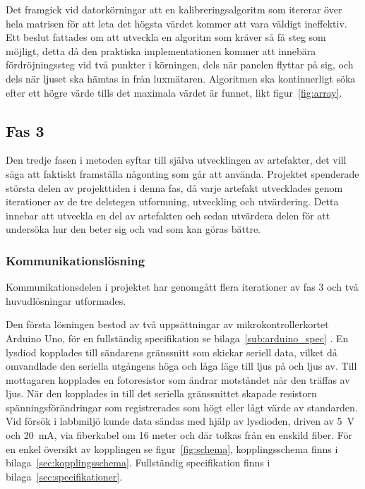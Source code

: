         Det framgick vid datorkörningar att en kalibreringsalgoritm som itererar över hela matrisen för att leta det högsta värdet kommer att vara väldigt ineffektiv. Ett beslut fattades om att utveckla en algoritm som kräver så få steg som möjligt, detta då den praktiska implementationen kommer att innebära fördröjningssteg vid två punkter i körningen, dels när panelen flyttar på sig, och dels när ljuset ska hämtas in från luxmätaren. Algoritmen ska kontinuerligt söka efter ett högre värde tills det maximala värdet är funnet, likt figur~\ref{fig:array}.


    \subsection{Fas 3} %
    \label{sub:steg_3}
        Den tredje fasen i metoden syftar till själva utvecklingen av artefakter, det vill säga att faktiskt framställa någonting som går att använda. Projektet spenderade största delen av projekttiden i denna fas, då varje artefakt utvecklades genom iterationer av de tre delstegen utformning, utveckling och utvärdering. Detta innebar att utveckla en del av artefakten och sedan utvärdera delen för att undersöka hur den beter sig och vad som kan göras bättre.

        \subsubsection{Kommunikationslösning} %
        \label{ssub:utformning_av_kommunikationslosning}
            Kommunikationsdelen i projektet har genomgått flera iterationer av fas 3 och två huvudlösningar utformades.\bigskip 

            Den första lösningen bestod av två uppsättningar av mikrokontrollerkortet Arduino Uno, för en fullständig specifikation se bilaga~\ref{sub:arduino_spec} \cite{ardu}. En lysdiod kopplades till sändarens gränssnitt som skickar seriell data, vilket då omvandlade den seriella utgångens höga och låga läge till ljus på och ljus av. Till mottagaren kopplades en fotoresistor som ändrar motståndet när den träffas av ljus. När den kopplades in till det seriella gränssnittet skapade resistorn spänningsförändringar som registrerades som högt eller lågt värde av standarden. Vid försök i labbmiljö kunde data sändas med hjälp av lysdioden, driven av 5~V och 20~mA, via fiberkabel om 16 meter och där tolkas från en enskild fiber. För en enkel översikt av kopplingen se figur~\ref{fig:schema}, kopplingsschema finns i bilaga~\ref{sec:kopplingsschema}. Fullständig specifikation finns i bilaga~\ref{sec:specifikationer}.\bigskip

